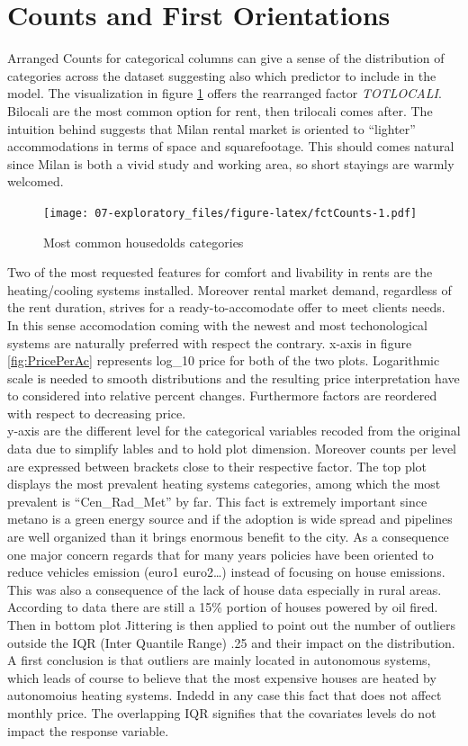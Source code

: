 \documentclass[
  12pt,
  a4paper,
  oneside]{book}
\theoremstyle{definition}
\theoremstyle{definition}
\theoremstyle{definition}
\theoremstyle{remark}
\begin{document}
\hypertarget{counts-and-first-orientations}{%
\section{Counts and First Orientations}\label{counts-and-first-orientations}}

Arranged Counts for categorical columns can give a sense of the distribution of categories across the dataset suggesting also which predictor to include in the model. The visualization in figure \ref{fig:fctCounts} offers the rearranged factor \emph{TOTLOCALI}.
Bilocali are the most common option for rent, then trilocali comes after. The intuition behind suggests that Milan rental market is oriented to ``lighter'' accommodations in terms of space and squarefootage. This should comes natural since Milan is both a vivid study and working area, so short stayings are warmly welcomed.

\begin{figure}
\centering
\texttt{[image: 07-exploratory\_files/figure-latex/fctCounts-1.pdf]}
\caption{\label{fig:fctCounts}Most common housedolds categories}
\end{figure}

Two of the most requested features for comfort and livability in rents are the heating/cooling systems installed. Moreover rental market demand, regardless of the rent duration, strives for a ready-to-accomodate offer to meet clients needs. In this sense accomodation coming with the newest and most techonological systems are naturally preferred with respect the contrary.
x-axis in figure \ref{fig:PricePerAc} represents log\_10 price for both of the two plots. Logarithmic scale is needed to smooth distributions and the resulting price interpretation have to considered into relative percent changes. Furthermore factors are reordered with respect to decreasing price.\\
y-axis are the different level for the categorical variables recoded from the original data due to simplify lables and to hold plot dimension. Moreover counts per level are expressed between brackets close to their respective factor.
The top plot displays the most prevalent heating systems categories, among which the most prevalent is ``Cen\_Rad\_Met'' by far. This fact is extremely important since metano is a green energy source and if the adoption is wide spread and pipelines are well organized than it brings enormous benefit to the city. As a consequence one major concern regards that for many years policies have been oriented to reduce vehicles emission (euro1 euro2\ldots) instead of focusing on house emissions. This was also a consequence of the lack of house data especially in rural areas. According to data there are still a 15\% portion of houses powered by oil fired.
Then in bottom plot Jittering is then applied to point out the number of outliers outside the IQR (Inter Quantile Range) .25 and their impact on the distribution. A first conclusion is that outliers are mainly located in autonomous systems, which leads of course to believe that the most expensive houses are heated by autonomoius heating systems. Indedd in any case this fact that does not affect monthly price. The overlapping IQR signifies that the covariates levels do not impact the response variable.
\end{document}
